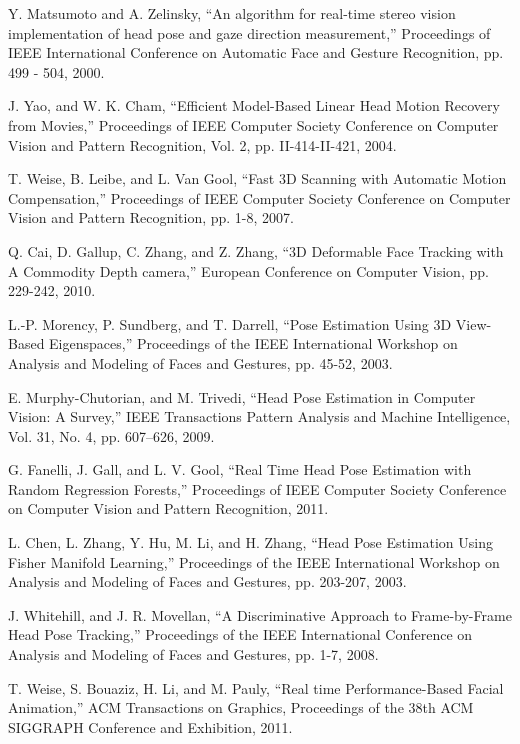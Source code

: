 \begin{thebibliography}{}
Y. Matsumoto and A. Zelinsky, “An algorithm for real-time stereo vision implementation of head pose and gaze direction measurement,” Proceedings of IEEE International Conference on  Automatic Face and Gesture Recognition, pp. 499 - 504, 2000.

J. Yao, and W. K. Cham, “Efficient Model-Based Linear Head Motion Recovery from Movies,” Proceedings of IEEE Computer Society Conference on Computer Vision and Pattern Recognition, Vol. 2, pp. II-414-II-421,  2004.

T. Weise, B. Leibe, and L. Van Gool, “Fast 3D Scanning with Automatic Motion Compensation,” Proceedings of IEEE Computer Society Conference on Computer Vision and Pattern Recognition, pp. 1-8, 2007.

Q. Cai, D. Gallup, C. Zhang, and Z. Zhang, “3D Deformable Face Tracking with A Commodity Depth camera,” European Conference on Computer Vision, pp. 229-242, 2010.

L.-P. Morency, P. Sundberg, and T. Darrell, “Pose Estimation Using 3D View-Based Eigenspaces,” Proceedings of the IEEE International Workshop on Analysis and Modeling of Faces and Gestures, pp. 45-52, 2003.

E. Murphy-Chutorian, and M. Trivedi, “Head Pose Estimation in Computer Vision: A Survey,” IEEE Transactions Pattern Analysis and Machine Intelligence, Vol. 31, No. 4, pp. 607–626,  2009.

G. Fanelli, J. Gall, and L. V. Gool, “Real Time Head Pose Estimation with Random Regression Forests,” Proceedings of IEEE Computer Society Conference on Computer Vision and Pattern Recognition, 2011.

L. Chen, L. Zhang, Y. Hu, M. Li, and H. Zhang, “Head Pose Estimation Using Fisher Manifold Learning,” Proceedings of the IEEE International Workshop on Analysis and Modeling of Faces and Gestures, pp. 203-207, 2003.
 
J. Whitehill, and J. R. Movellan, “A Discriminative Approach to Frame-by-Frame Head Pose Tracking,” Proceedings of the IEEE International Conference on Analysis and Modeling of Faces and Gestures, pp. 1-7, 2008.

T. Weise, S. Bouaziz, H. Li, and M. Pauly, “Real time Performance-Based Facial Animation,” ACM Transactions on Graphics, Proceedings of the 38th ACM SIGGRAPH Conference and Exhibition, 2011.


\end{thebibliography}
